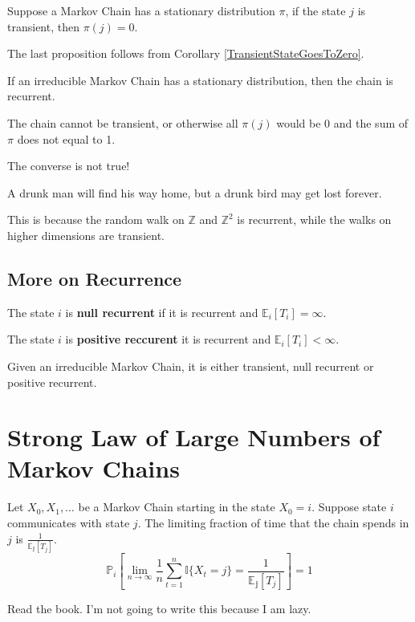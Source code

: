 \begin{proposition}
    Suppose a Markov Chain has a stationary distribution $\pi$, if the state $j$ is transient, then $\pi(j) = 0$.
\end{proposition}
The last proposition follows from Corollary \ref{TransientStateGoesToZero}.

\begin{corollary}
    If an irreducible Markov Chain has a stationary distribution, then the chain is recurrent.
\end{corollary}
\begin{sketchproof}
    The chain cannot be transient, or otherwise all $\pi(j)$ would be 0 and the sum of $\pi$ does not equal to 1.
\end{sketchproof}
\begin{remark}
    The converse is not true!
\end{remark}

\begin{proposition}
    A drunk man will find his way home, but a drunk bird may get lost forever.
\end{proposition}
This is because the random walk on $\mathbb{Z}$ and $\mathbb{Z}^2$ is recurrent, while the walks on higher dimensions are transient.

\subsection{More on Recurrence}
\begin{definition}
    The state $i$ is \textbf{null recurrent} if it is recurrent and $\mathbb{E}_i[T_i] = \infty$.
\end{definition}
\begin{definition}
    The state $i$ is \textbf{positive reccurent} it is recurrent and $\mathbb{E}_i[T_i] < \infty$.
\end{definition}

\begin{proposition}
    Given an irreducible Markov Chain, it is either transient, null recurrent or positive recurrent.
\end{proposition}

\section{Strong Law of Large Numbers of Markov Chains}
\begin{theorem}\label{SLLN}
    Let $X_0, X_1, \dots$ be a Markov Chain starting in the state $X_0=i$. Suppose state $i$ communicates with state $j$. The limiting fraction of time that the chain spends in $j$ is $\frac{1}{\mathbb{E_j}[T_j]}$.
    \[ \mathbb{P}_i[\lim_{n\to\infty}\frac{1}{n}\sum_{t=1}^n\mathbb{I}\{X_t=j\} = \frac{1}{\mathbb{E_j}[T_j]}] = 1 \]
\end{theorem}
\begin{sketchproof}
    Read the book. I'm not going to write this because I am lazy.
\end{sketchproof}

